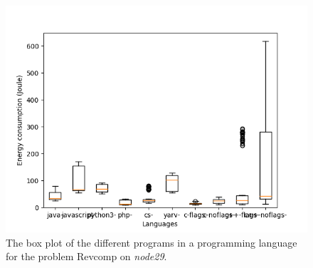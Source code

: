 \begin{appendices}
\begin{table}[h]
\centering
{}
\caption{The comparison of the different languages for the Nbody problem on \textit{node29}. A \textit{+} means that the language on the row has a lower energy consumption then the language on the column, the opposite for \textit{-}, and the \textit{Unknown} means that we could not reject the null hypothesis.}
\label{tab:lang-nbody2}
\end{table}

\begin{figure}[h]
    \centering
    \includegraphics[width=.6\textwidth]{graphs/revcomp_BOXoverview2.png}
    \caption{The box plot of the different programs in a programming language for the problem Revcomp on \textit{node29}.}
    \label{fig:box-revcomp2}
\end{figure}


\end{appendices}
